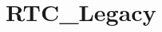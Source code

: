 \hypertarget{group___r_t_c___legacy}{\section{R\-T\-C\-\_\-\-Legacy}
\label{group___r_t_c___legacy}
}
